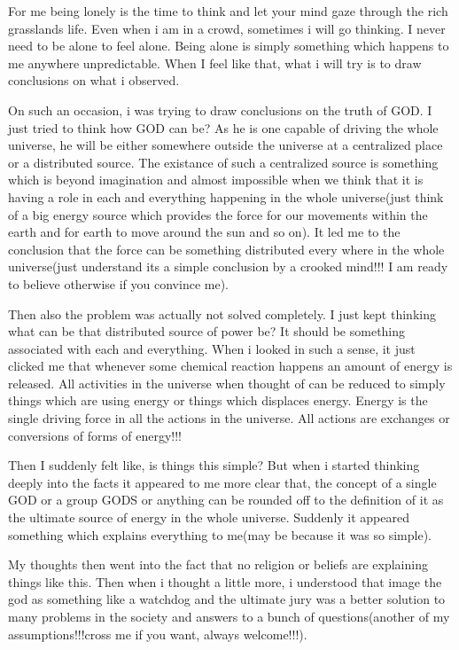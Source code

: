 \vskip 2pt

For me being lonely is the time to think and let your mind gaze through the rich grasslands life. Even when i am in a crowd, sometimes i will go thinking. I never need to be alone to feel alone. Being alone is simply something which happens to me anywhere unpredictable. When I feel like that, what i will try is to draw conclusions on what i observed.

On such an occasion, i was trying to draw conclusions on the truth of GOD. I just tried to think how GOD can be? As he is one capable of driving the whole universe, he will be either somewhere outside the universe at a centralized place or a distributed source. The existance of such a centralized source is something which is beyond imagination and almost impossible when we think that it is having a role in each and everything happening in the whole universe(just think of a big energy source which provides the force for our movements within the earth and for earth to move around the sun and so on). It led me to the conclusion that the force can be something distributed every where in the whole universe(just understand its a simple conclusion by a crooked mind!!! I am ready to believe otherwise if you convince me).

Then also the problem was actually not solved completely. I just kept thinking what can be that distributed source of power be? It should be something associated with each and everything. When i looked in such a sense, it just clicked me that whenever some chemical reaction happens an amount of energy is released. All activities in the universe when thought of can be reduced to simply things which are using energy or things which displaces energy. Energy is the single driving force in all the actions in the universe. All actions are exchanges or conversions of forms of energy!!!

Then I suddenly felt like, is things this simple? But when i started thinking deeply into the facts it appeared to me more clear that, the concept of a single GOD or a group GODS or anything can be rounded off to the definition of it as the ultimate source of energy in the whole universe. Suddenly it appeared something which explains everything to me(may be because it was so simple).

My thoughts then went into the fact that no religion or beliefs are explaining things like this. Then when i thought a little more, i understood that image the god as something like a watchdog and the ultimate jury was a better solution to many problems in the society and answers to a bunch of questions(another of my assumptions!!!cross me if you want, always welcome!!!).

